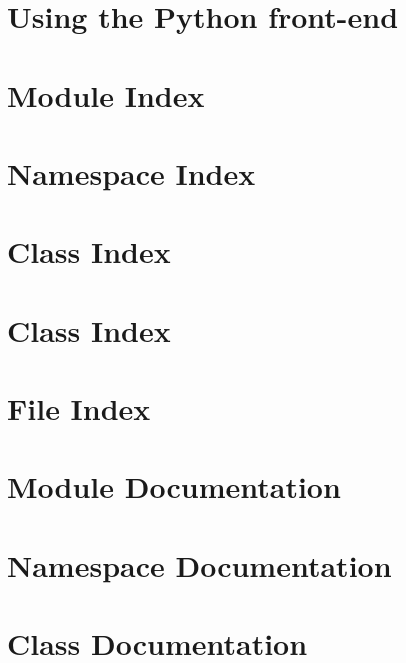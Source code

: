 \documentclass[a4paper]{book}
\begin{document}
\chapter{Using the Python front-\/end}
\label{using_python}

\chapter{Module Index}

\chapter{Namespace Index}

\chapter{Class Index}

\chapter{Class Index}

\chapter{File Index}

\chapter{Module Documentation}















\chapter{Namespace Documentation}

\chapter{Class Documentation}













\end{document}
